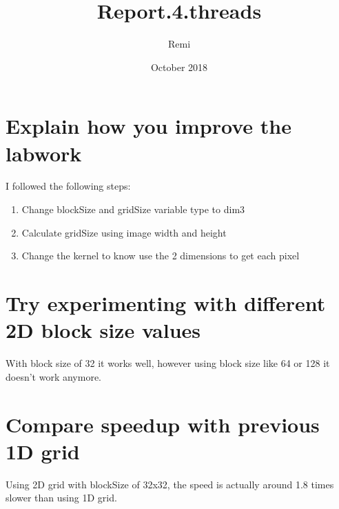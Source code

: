 \documentclass{article}
\title{Report.4.threads}
\author{Remi}
\date{October 2018}
\begin{document}
\maketitle

\section{Explain how you improve the labwork}

I followed the following steps:
\begin{enumerate}  
\item Change blockSize and gridSize variable type to dim3
\item Calculate gridSize using image width and height
\item Change the kernel to know use the 2 dimensions to get each pixel
\end{enumerate}

\section{Try experimenting with different 2D block size values}

With block size of 32 it works well, however using block size like 64 or 128 it doesn't work anymore.


\section{Compare speedup with previous 1D grid}

Using 2D grid with blockSize of 32x32, the speed is actually around 1.8 times slower than using 1D grid.
\end{document}
